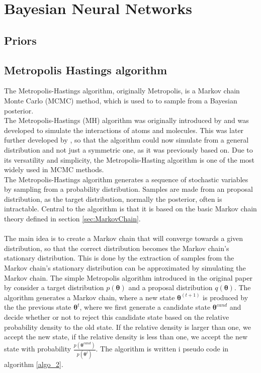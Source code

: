\chapter{Bayesian Neural Networks}
\section{Priors}

\section{Metropolis Hastings algorithm}

The Metropolis-Hastings algorithm, originally Metropolis, is a Markov chain Monte Carlo (MCMC) method, which is used to to sample from a Bayesian posterior. \\
The Metropolis-Hastings (MH) algorithm was originally introduced by \cite{Metropolis1953} and was developed to simulate the interactions of atoms and molecules. This was later further developed by \cite{hastings70}, so that the algorithm could now simulate from a general distribution and not just a symmetric one, as it was previously based on. Due to its versatility and simplicity, the Metropolis-Hasting algorithm is one of the most widely used in MCMC methods.
\\
The Metropolis-Hastings algorithm generates a sequence of stochastic variables by sampling from a probability distribution. Samples are made from an proposal distribution, as the target distribution, normally the posterior, often is intractable. Central to the algorithm is that it is based on the basic Markov chain theory defined in section \ref{sec:MarkovChain}.\\
\\
The main idea is to create a Markov chain that will converge towards a given distribution, so that the correct distribution becomes the Markov chain's stationary distribution. This is done by the extraction of samples from the Markov chain's stationary distribution can be approximated by simulating the Markov chain. The simple Metropolis algorithm introduced in the original paper by \cite{Metropolis1953} consider a target distribution $p(\boldsymbol{\theta})$ and a proposal distribution $q(\boldsymbol{\theta})$. The algorithm generates a Markov chain, where a new state $\boldsymbol{\theta}^{(t+1)}$ is produced by the the previous state $\boldsymbol{\theta}^t$, where we first generate a candidate state $\boldsymbol{\theta}^{cand}$ and decide whether or not to reject this candidate state based on the relative probability density to the old state. If the relative density is larger than one, we accept the new state, if the relative density is less than one, we accept the new state with probability $\frac{p(\boldsymbol{\theta}^{cand})}{p(\boldsymbol{\theta}^{t})}$. The algorithm is written i pseudo code in algorithm \ref{algo_2}.


